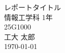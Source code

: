 \documentclass[uplatex,dvipdfmx]{jlreq}
\begin{document}
\begin{titlepage}
\vspace*{3cm}
\centering
\Huge\textsf{レポートタイトル}\\[2cm]
\Large\textsf{情報工学科 1年}\\
\Large\textsf{25G1000}\\[5pt]
\huge\textsf{工大 太郎}\\[1cm] 
\Large\textsf{\today}
\end{titlepage}
\clearpage


%
%


%
\end{document}
